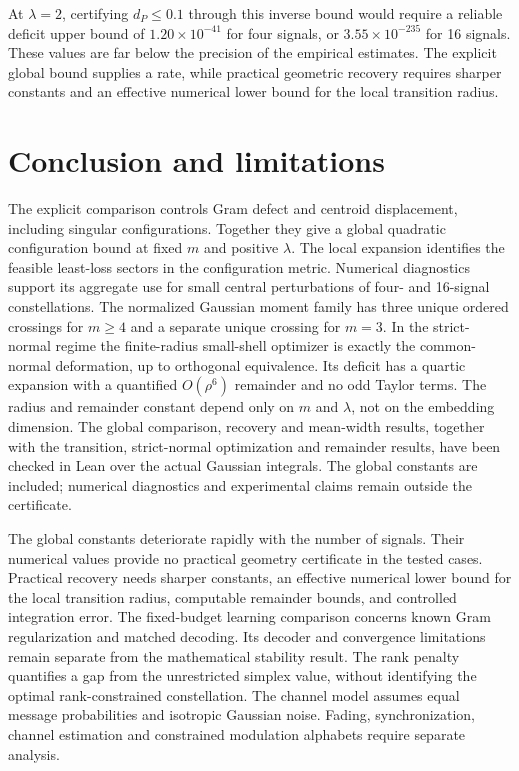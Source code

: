\documentclass[11pt]{article}
\theoremstyle{remark}\newtheorem{remark}[theorem]{Remark}
\begin{document}
At $\lambda=2$, certifying $d_P\le0.1$ through this inverse bound would
require a reliable deficit upper bound of $1.20\times10^{-41}$ for four signals,
or $3.55\times10^{-235}$ for 16 signals.
These values are far below the precision of the empirical estimates.
The explicit global bound supplies a rate, while practical geometric recovery
requires sharper constants and an effective numerical lower bound for the local transition radius.

\section{Conclusion and limitations}
The explicit comparison controls Gram defect and centroid displacement,
including singular configurations. Together they give a global quadratic
configuration bound at fixed $m$ and positive $\lambda$.
The local expansion identifies the feasible least-loss sectors in the
configuration metric. Numerical diagnostics support its aggregate use for
small central perturbations of four- and 16-signal constellations.
The normalized Gaussian moment family has three unique ordered crossings
for $m\ge4$ and a separate unique crossing for $m=3$.
In the strict-normal regime the finite-radius small-shell optimizer is
exactly the common-normal deformation, up to orthogonal equivalence.
Its deficit has a quartic expansion with a quantified $O(\rho^6)$
remainder and no odd Taylor terms. The radius and remainder constant
depend only on $m$ and $\lambda$, not on the embedding dimension.
The global comparison, recovery and mean-width results, together with
the transition, strict-normal optimization and remainder results, have
been checked in Lean over the actual Gaussian integrals. The global
constants are included; numerical diagnostics and experimental claims
remain outside the certificate.

The global constants deteriorate rapidly with the number of signals.
Their numerical values provide no practical geometry certificate in the
tested cases. Practical recovery needs sharper constants, an effective numerical lower
bound for the local transition radius, computable remainder bounds,
and controlled integration error.
The fixed-budget learning comparison concerns known Gram regularization
and matched decoding. Its decoder and convergence limitations remain separate
from the mathematical stability result.
The rank penalty quantifies a gap from the unrestricted simplex value,
without identifying the optimal rank-constrained constellation.
The channel model assumes equal message probabilities and isotropic Gaussian
noise. Fading, synchronization, channel estimation and constrained modulation
alphabets require separate analysis.
\end{document}
